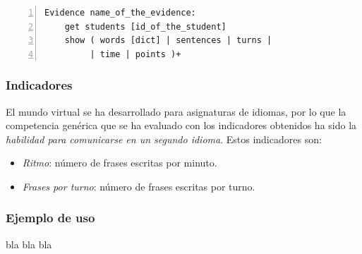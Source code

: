 \begin{lstlisting}[caption=Palabras reservadas y formato de VWQL (version 0.1), label=code:reserved,numbers=left, captionpos=b, morekeywords={Evidence,get, students, show, words, sentences, turns, time, points}]
Evidence name_of_the_evidence:
    get students [id_of_the_student]
    show ( words [dict] | sentences | turns |
         | time | points )+
\end{lstlisting}

\subsubsection{Indicadores}

El mundo virtual se ha desarrollado para asignaturas de idiomas, por lo que la competencia genérica que se ha evaluado con los indicadores obtenidos ha sido la \emph{habilidad para comunicarse en un segundo idioma}. Estos indicadores son:


\begin{itemize}
\item \emph{Ritmo}: número de frases escritas por minuto.
\item \emph{Frases por turno}: número de frases escritas por turno.
\end{itemize}

\subsubsection{Ejemplo de uso}

bla bla bla






 


